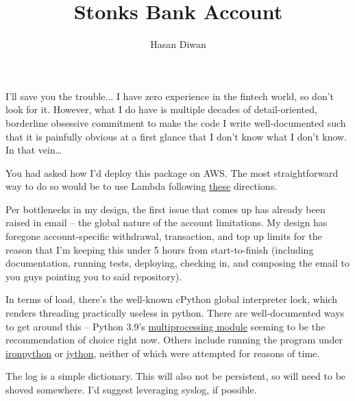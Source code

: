 \documentclass{article}
\begin{document}
\title{Stonks Bank Account}
\author{Hasan Diwan}
{
    \let\clearpage\relax
    \maketitle
}
\begin{center}
\maketitle
\end{center}

I'll save you the trouble... I have zero experience in the fintech
world, so don't look for it. However, what I do have is multiple
decades of detail-oriented, borderline obsessive commitment to make
the code I write well-documented such that it is painfully obvious at
a first glance that I don't know what I don't know. In that vein\ldots

You had asked how I'd deploy this package on AWS. The most
straightforward way to do so would be to use Lambda following
\href{https://docs.aws.amazon.com/lambda/latest/dg/python-package-create.html}{these}
directions.

Per bottlenecks in my design, the first issue that comes up has
already been raised in email -- the global nature of the account
limitations. My design has foregone account-specific withdrawal,
transaction, and top up limits for the reason that I'm keeping this
under 5 hours from start-to-finish (including documentation, running
tests, deploying, checking in, and composing the email to you guys
pointing you to said repository).

In terms of load, there's the well-known cPython global interpreter lock, which renders threading
practically useless in python. There are well-documented ways to get
around this -- Python 3.9's \href{https://docs.python.org/3/library/multiprocessing.html}{multiprocessing
  module} seeming to be the recommendation of choice right now. Others include
running the program under \href{https://ironpython.net/}{ironpython}
or \href{https://jython.org}{jython}, neither of which were attempted for reasons of time.

The log is a simple dictionary. This will also not be persistent, so will need to be shoved somewhere. I'd suggest leveraging syslog, if possible. 
\end{document}
